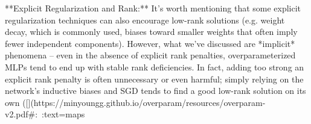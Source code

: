 **Explicit Regularization and Rank:** It’s worth mentioning that some explicit regularization techniques can also encourage low-rank solutions (e.g. weight decay, which is commonly used, biases toward smaller weights that often imply fewer independent components). However, what we’ve discussed are *implicit* phenomena – even in the absence of explicit rank penalties, overparameterized MLPs tend to end up with stable rank deficiencies. In fact, adding too strong an explicit rank penalty is often unnecessary or even harmful; simply relying on the network’s inductive biases and SGD tends to find a good low-rank solution on its own ([](https://minyoungg.github.io/overparam/resources/overparam-v2.pdf#:~:text=maps%

